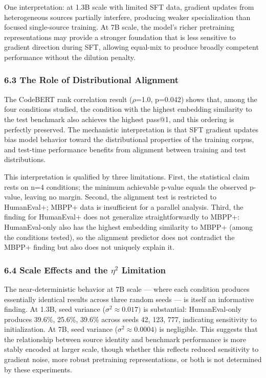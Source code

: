 One interpretation: at 1.3B scale with limited SFT data, gradient updates from heterogeneous sources partially interfere, producing weaker specialization than focused single-source training. At 7B scale, the model's richer pretraining representations may provide a stronger foundation that is less sensitive to gradient direction during SFT, allowing equal-mix to produce broadly competent performance without the dilution penalty.

\subsubsection{6.3 The Role of Distributional Alignment}

The CodeBERT rank correlation result ($\rho$=1.0, p=0.042) shows that, among the four conditions studied, the condition with the highest embedding similarity to the test benchmark also achieves the highest pass@1, and this ordering is perfectly preserved. The mechanistic interpretation is that SFT gradient updates bias model behavior toward the distributional properties of the training corpus, and test-time performance benefits from alignment between training and test distributions.

This interpretation is qualified by three limitations. First, the statistical claim rests on n=4 conditions; the minimum achievable p-value equals the observed p-value, leaving no margin. Second, the alignment test is restricted to HumanEval+; MBPP+ data is insufficient for a parallel analysis. Third, the finding for HumanEval+ does not generalize straightforwardly to MBPP+: HumanEval-only also has the highest embedding similarity to MBPP+ (among the conditions tested), so the alignment predictor does not contradict the MBPP+ finding but also does not uniquely explain it.

\subsubsection{6.4 Scale Effects and the $\eta^2$ Limitation}

The near-deterministic behavior at 7B scale --- where each condition produces essentially identical results across three random seeds --- is itself an informative finding. At 1.3B, seed variance ($\sigma ^{2}\approx 0.017)$ is substantial: HumanEval-only produces 39.6\%, 25.6\%, 39.6\% across seeds 42, 123, 777, indicating sensitivity to initialization. At 7B, seed variance ($\sigma ^{2}\approx 0.0004)$ is negligible. This suggests that the relationship between source identity and benchmark performance is more stably encoded at larger scale, though whether this reflects reduced sensitivity to gradient noise, more robust pretraining representations, or both is not determined by these experiments.

